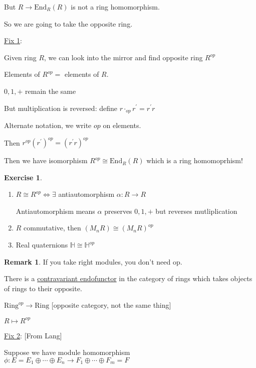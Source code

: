 \documentclass{article}
\theoremstyle{definition}
\newtheorem*{exercise}{Exercise}
\newtheorem*{remark}{Remark}
\begin{document}
But \(R \to \text{End}_R(R)\) is not a ring homomorphism.

So we are going to take the opposite ring.

\underline{Fix 1}:

Given ring \(R\), we can look into the mirror and find opposite ring \(R^{op}\)

Elements of \(R^{op} =\) elements of \(R\).

\(0, 1, +\) remain the same 

But multiplication is reversed: define \(r \cdot_{op} r^{\prime} = r^{\prime} r\) 

Alternate notation, we write \(op\) on elements.

Then \(r^{op}(r^{\prime} )^{op} = (r^{\prime} r)^{op}\) 

Then we have isomorphism \(R^{op} \cong \text{End}_R(R)\) which is a ring homomoprhism!

\begin{exercise}


    \begin{enumerate}[label=\arabic*)]

        \item \(R \cong R^{op} \iff \exists\) antiautomorphism \(\alpha : R \to R\) 

        Antiautomorphism means \(\alpha\) preserves \(0, 1, +\) but reverses mutliplication

        \item \(R\) commutative, then \((M_n R) \cong (M_n R)^{op}\) 

        \item Real quaternions \(\mathbb{H} \cong \mathbb{H} ^{op}\) 

    \end{enumerate}

\end{exercise}


\begin{remark}
    If you take right modules, you don't need op.
\end{remark}

There is a \underline{contravariant endofunctor} in the category of rings which takes objects of rings to their opposite.

\(\text{Ring}^{op} \to \text{Ring}\) [opposite category, not the same thing]

\(R \mapsto R^{op}\) 

\underline{Fix 2}: [From Lang]

Suppose we have module homomorphism \(\phi : E = E_1 \oplus \cdots \oplus  E_n \to F_1 \oplus \cdots \oplus F_m = F\) 
\end{document}
